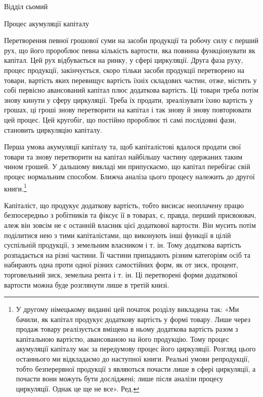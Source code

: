 Відділ сьомий

Процес акумуляції капіталу

Перетворення певної грошової суми на засоби продукції та
робочу силу є перший рух, що його пророблює певна кількість
вартости, яка повинна функціонувати як капітал. Цей рух відбувається
на ринку, у сфері циркуляції. Друга фаза руху, процес
продукції, закінчується, скоро тільки засоби продукції
перетворено на товари, вартість яких перевищує вартість їхніх
складових частин, отже, містить у собі первісно авансований
капітал плюс додаткова вартість. Ці товари треба потім знову
кинути у сферу циркуляції. Треба їх продати, зреалізувати їхню
вартість у грошах, ці гроші знову перетворити на капітал і
так знову й знову повторювати цей процес. Цей кругобіг, що
постійно пророблює ті самі послідовні фази, становить циркуляцію
капіталу.

Перша умова акумуляції капіталу та, щоб капіталістові вдалося
продати свої товари та знову перетворити на капітал найбільшу
частину одержаних таким чином грошей. У дальшому
викладі ми припускаємо, що капітал перебігає свій процес нормальним
способом. Ближча аналіза цього процесу належить до
другої книги.\footnote*{
У другому німецькому виданні цей початок розділу викладена
так: «Ми бачили, як капітал продукує додаткову вартість у формі товару.
Лише через продаж товару реалізується вміщена в ньому додаткова
вартість разом з капітальною вартістю, авансованою на його продукцію.
Тому процес акумуляції капіталу має за передумову процес його циркуляції.
Розгляд цього останнього ми відкладаємо до наступної книги.
Реальні умови репродукції, тобто безперервної продукції з являються
почасти лише в сфері циркуляції, а почасти вони можуть бути досліджені;
лише після аналізи процесу циркуляції. Однак це ще не все». Ред.
}

Капіталіст, що продукує додаткову вартість, тобто висисає
неоплачену працю безпосередньо з робітників та фіксує її в товарах,
є, правда, перший присвоювач, алеж він зовсім не є
останній власник цієї додаткової вартости. Він мусить потім
поділитися нею з тими капіталістами, що виконують інші функції
в цілій суспільній продукції, з земельним власником і т. ін.
Тому додаткова вартість розпадається на різні частини. Її частини
припадають різним категоріям осіб та набирають одна проти
одної різних самостійних форм, як от зиск, процент, торговельний
зиск, земельна рента і т. ін. Ці перетворені форми додаткової
вартости можна буде розглянути лише в третій книзі.
